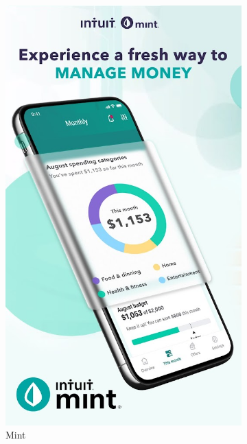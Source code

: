\documentclass[shortabstract,inz]{iithesis}
\begin{document}
\begin{figure}
\centering
\begin{subfigure}{0.45\textwidth}
    \includegraphics[width=\textwidth]{mint-screen.jpg}
    \caption{Mint}
    \label{fig:mint}
\end{subfigure}
\hfill
\begin{subfigure}{0.45\textwidth}

\end{subfigure}
\end{figure}
\end{document}
